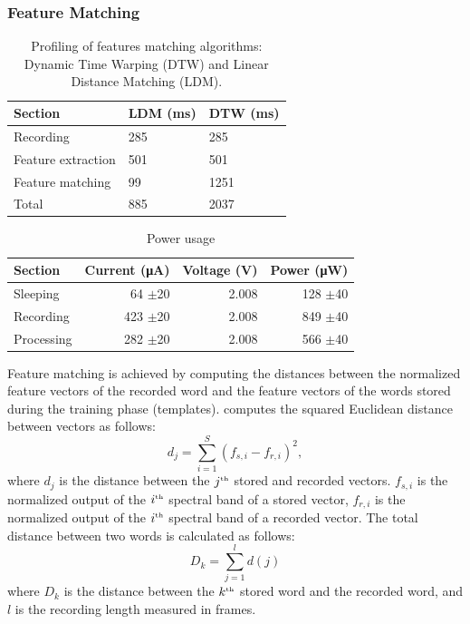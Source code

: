 \subsubsection{Feature Matching}
\begin{table}[t]
	\centering
	\caption{Profiling of features matching algorithms: Dynamic Time Warping (DTW) and Linear Distance Matching (LDM).}
	\label{tab:profiling}
	\begin{tabular}{lll} \hline
	Section & LDM (ms) & DTW (ms) \\\hline
	Recording & 285  & 285 \\
	Feature extraction & 501 & 501 \\
	Feature matching &  99 & 1251 \\\hline
	Total & 885 & 2037 \\\hline
	\end{tabular}
\end{table}
%
\begin{table}[t]
	\centering
	\caption{Power usage}
	\label{tab:power_usage}
	\begin{tabular}{lrrr}\hline
	Section & Current (\si{\micro A}) & Voltage (V) &  Power (\si{\micro W}) \\\hline
	Sleeping & 64 $\pm$20 & 2.008 & 128 $\pm$40 \\
	Recording & 423 $\pm$20  & 2.008 &  849 $\pm$40\\
	Processing &  282 $\pm$20 & 2.008& 566 $\pm$40 \\\hline
	\end{tabular}
\end{table}
%
Feature matching is achieved by computing the distances between the normalized feature vectors of the recorded word and the feature vectors of the words stored during the training phase (templates). 
\cim computes the squared Euclidean distance between vectors as follows:
\begin{equation}
	 	d_j = \sum\limits^S_{i=1} (f_{s,i} - f_{r,i})^2,
    \label{eq:frame_dist}
\end{equation}
where $d_j$ is the distance between the $j^{\text{\tiny th}}$ stored and recorded vectors. $f_{s,i}$ is the normalized output of the $i^{\text{\tiny th}}$ spectral band of a stored vector, $f_{r,i}$ is the normalized output of the $i^{\text{\tiny th}}$ spectral band of a recorded vector. 
The total distance between two words is calculated as follows:
\begin{equation}
		D_k = \sum\limits^{l}_{j=1} d(j)
\end{equation}
where $D_k$ is the distance between the $k^{\text{\tiny th}}$ stored word and the recorded word, and $l$ is the recording length measured in frames.

